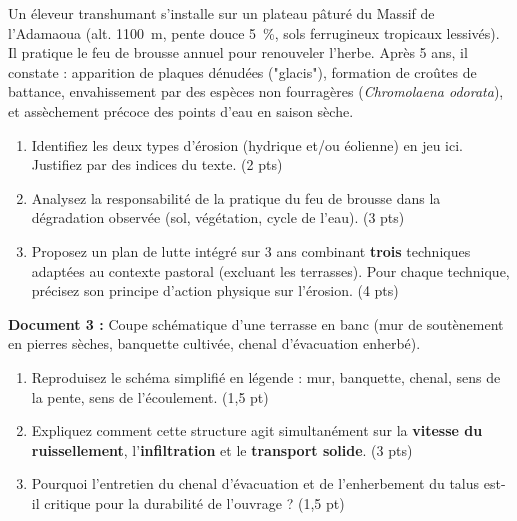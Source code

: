 \documentclass[11pt]{article}
\begin{document}
\begin{exercice}
Un éleveur transhumant s'installe sur un plateau pâturé du Massif de l'Adamaoua (alt. \SI{1100}{\meter}, pente douce \SI{5}{\percent}, sols ferrugineux tropicaux lessivés). Il pratique le feu de brousse annuel pour renouveler l'herbe. Après 5 ans, il constate : apparition de plaques dénudées ("glacis"), formation de croûtes de battance, envahissement par des espèces non fourragères (\textit{Chromolaena odorata}), et assèchement précoce des points d'eau en saison sèche.
\begin{enumerate}
    \item Identifiez les deux types d'érosion (hydrique et/ou éolienne) en jeu ici. Justifiez par des indices du texte. (2 pts)
    \item Analysez la responsabilité de la pratique du feu de brousse dans la dégradation observée (sol, végétation, cycle de l'eau). (3 pts)
    \item Proposez un plan de lutte intégré sur 3 ans combinant \textbf{trois} techniques adaptées au contexte pastoral (excluant les terrasses). Pour chaque technique, précisez son principe d'action physique sur l'érosion. (4 pts)
\end{enumerate}
\end{exercice}

\begin{exercice}
\textbf{Document 3 :} Coupe schématique d'une terrasse en banc (mur de soutènement en pierres sèches, banquette cultivée, chenal d'évacuation enherbé).
\begin{enumerate}
    \item Reproduisez le schéma simplifié en légende : mur, banquette, chenal, sens de la pente, sens de l'écoulement. (1,5 pt)
    \item Expliquez comment cette structure agit simultanément sur la \textbf{vitesse du ruissellement}, l'\textbf{infiltration} et le \textbf{transport solide}. (3 pts)
    \item Pourquoi l'entretien du chenal d'évacuation et de l'enherbement du talus est-il critique pour la durabilité de l'ouvrage ? (1,5 pt)
\end{enumerate}
\end{exercice}
\end{document}
